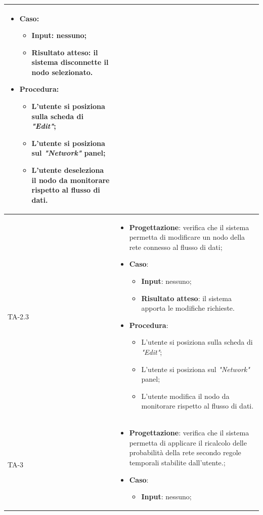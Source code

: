 \begin{longtable}{|C{2.5cm}|C{13cm}|}
\begin{itemize}
	\item \textbf{Caso}: 
	\begin{itemize}
		\item \textbf{Input}: nessuno;
		\item \textbf{Risultato atteso}: il sistema disconnette il nodo selezionato.
	\end{itemize}
	\item \textbf{Procedura}:
	\begin{itemize}
		\item L'utente si posiziona sulla scheda di \emph{"Edit"};
		\item L'utente si posiziona sul \emph{"Network"} panel;
		\item L'utente deseleziona il nodo da monitorare rispetto al flusso di dati.
	\end{itemize} 
\end{itemize} \\
\hline
{TA-2.3} &
\begin{itemize}
	\item \textbf{Progettazione}: verifica che il sistema permetta di modificare un nodo della rete connesso al flusso di dati;
	\item \textbf{Caso}: 
	\begin{itemize}
		\item \textbf{Input}: nessuno;
		\item \textbf{Risultato atteso}: il sistema apporta le modifiche richieste.
	\end{itemize}
	\item \textbf{Procedura}:
	\begin{itemize}
		\item L'utente si posiziona sulla scheda di \emph{"Edit"};
		\item L'utente si posiziona sul \emph{"Network"} panel;
		\item L'utente modifica il nodo da monitorare rispetto al flusso di dati.
	\end{itemize} 
\end{itemize}\\
\hline
{TA-3} &
\begin{itemize}
	\item \textbf{Progettazione}: verifica che il sistema permetta di applicare il
	ricalcolo delle probabilità della rete
	secondo regole temporali stabilite dall'utente.;
	\item \textbf{Caso}: 
	\begin{itemize}
		\item \textbf{Input}: nessuno;

\end{itemize}
\end{itemize}
\end{longtable}
